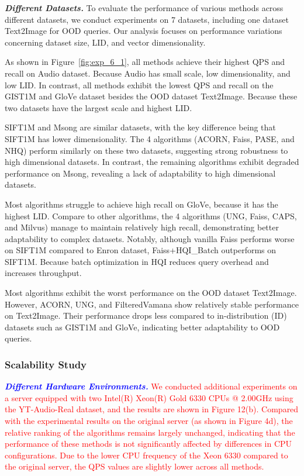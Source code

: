 \documentclass[sigconf, nonacm]{acmart}
\begin{document}
	\textit{\textbf{Different Datasets.}}  
	To evaluate the performance of various methods across different datasets, we conduct experiments on 7 datasets, including one dataset Text2Image for OOD queries. Our analysis focuses on performance variations concerning dataset size, LID, and vector dimensionality.
	
	As shown in Figure~\ref{fig:exp_6_1}, all methods achieve their highest QPS and recall on Audio dataset. Because Audio has small scale, low dimensionality, and low LID. In contrast, all methods exhibit the lowest QPS and recall on the GIST1M and GloVe dataset besides the OOD dataset Text2Image. Because these two datasets have the largest scale and highest LID.
	
	SIFT1M and Msong are similar datasets, with the key difference being that SIFT1M has lower dimensionality. The 4 algorithms (ACORN, Faiss, PASE, and NHQ) perform similarly on these two datasets, suggesting strong robustness to high dimensional datasets. In contrast, the remaining algorithms exhibit degraded performance on Msong, revealing a lack of adaptability to high dimensional datasets.
	
	Most algorithms struggle to achieve high recall on GloVe, because it has the highest LID. Compare to other algorithms, the 4 algorithms (UNG, Faiss, CAPS, and Milvus) manage to maintain relatively high recall, demonstrating better adaptability to complex datasets. Notably, although vanilla Faiss performs worse on SIFT1M compared to Enron dataset, Faiss+HQI\_Batch outperforms on SIFT1M. Because batch optimization in HQI reduces query overhead and increases throughput.
	
	Most algorithms exhibit the worst performance on the OOD dataset Text2Image. However, ACORN, UNG, and FilteredVamana show relatively stable performance on Text2Image. Their performance drops less compared to in-distribution (ID) datasets such as GIST1M and GloVe, indicating better adaptability to OOD queries.
	
	\subsubsection{Scalability Study}
	
	\textit{\textbf{\textcolor{blue}{Different Hardware Environments.}}} 
	\textcolor{red}{We conducted additional experiments on a server equipped with two Intel(R) Xeon(R) Gold 6330 CPUs @ 2.00GHz using the YT-Audio-Real dataset, and the results are shown in Figure 12(b). Compared with the experimental results on the original server (as shown in Figure 4d), the relative ranking of the algorithms remains largely unchanged, indicating that the performance of these methods is not significantly affected by differences in CPU configurations. Due to the lower CPU frequency of the Xeon 6330 compared to the original server, the QPS values are slightly lower across all methods.}
\end{document}
